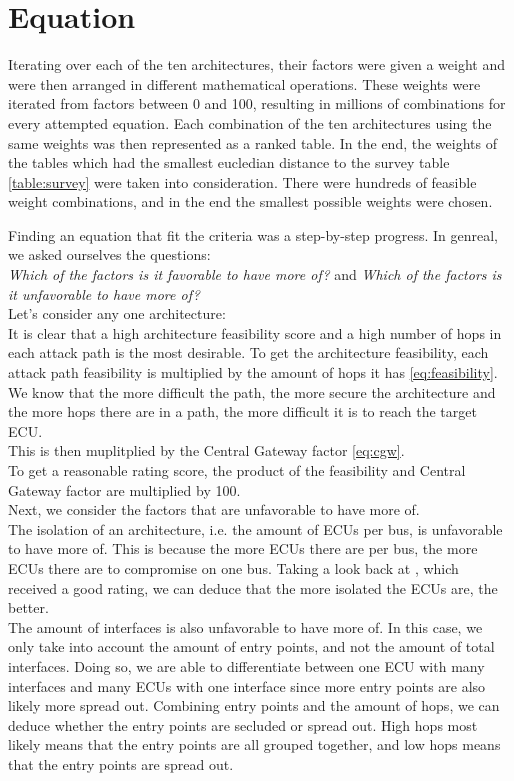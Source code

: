 \section{Equation}
\label{sec:equation}

Iterating over each of the ten architectures, their factors were given a weight and were then arranged in different mathematical operations.
These weights were iterated from factors between 0 and 100, resulting in millions of combinations for every attempted equation.
Each combination of the ten architectures using the same weights was then represented as a ranked table. 
In the end, the weights of the tables which had the smallest eucledian distance to the survey table \ref{table:survey} were taken into consideration.
There were hundreds of feasible weight combinations, and in the end the smallest possible weights were chosen.

Finding an equation that fit the criteria was a step-by-step progress.
In genreal, we asked ourselves the questions:\\
\textit{Which of the factors is it favorable to have more of?} and \textit{Which of the factors is it unfavorable to have more of?}\\

Let's consider any one architecture:\\
It is clear that a high architecture feasibility score and a high number of hops in each attack path is the most desirable.
To get the architecture feasibility, each attack path feasibility is multiplied by the amount of hops it has \ref{eq:feasibility}.
We know that the more difficult the path, the more secure the architecture and the more hops there are in a path, the more difficult it is to reach the target ECU.\\
This is then muplitplied by the Central Gateway factor \ref{eq:cgw}.\\
To get a reasonable rating score, the product of the feasibility and Central Gateway factor are multiplied by 100.\\

Next, we consider the factors that are unfavorable to have more of.\\
The isolation of an architecture, i.e. the amount of ECUs per bus, is unfavorable to have more of.
This is because the more ECUs there are per bus, the more ECUs there are to compromise on one bus.
Taking a look back at , which received a good rating, we can deduce that the more isolated the ECUs are, the better.\\
The amount of interfaces is also unfavorable to have more of.
In this case, we only take into account the amount of entry points, and not the amount of total interfaces.
Doing so, we are able to differentiate between one ECU with many interfaces and many ECUs with one interface since more entry points are also likely more spread out.
Combining entry points and the amount of hops, we can deduce whether the entry points are secluded or spread out.
High hops most likely means that the entry points are all grouped together, and low hops means that the entry points are spread out.\\

